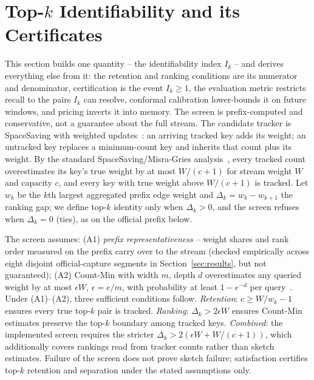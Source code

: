 \documentclass[conference]{IEEEtran}
\begin{document}
\section{Top-$k$ Identifiability and its Certificates}
\label{sec:screen}
This section builds one quantity -- the identifiability index $I_k$ -- and derives everything else from it: the retention and ranking conditions are its numerator and denominator, certification is the event $I_k\geq1$, the evaluation metric restricts recall to the pairs $I_k$ can resolve, conformal calibration lower-bounds it on future windows, and pricing inverts it into memory. The screen is prefix-computed and conservative, not a guarantee about the full stream. The candidate tracker is SpaceSaving with weighted updates~\cite{metwally2005spacesaving}: an arriving tracked key adds its weight; an untracked key replaces a minimum-count key and inherits that count plus its weight. By the standard SpaceSaving/Misra-Gries analysis~\cite{misra1982finding,metwally2005spacesaving}, every tracked count overestimates its key's true weight by at most $W/(c+1)$ for stream weight $W$ and capacity $c$, and every key with true weight above $W/(c+1)$ is tracked. Let $w_k$ be the $k$th largest aggregated prefix edge weight and $\Delta_k=w_k-w_{k+1}$ the ranking gap; we define top-$k$ identity only when $\Delta_k>0$, and the screen refuses when $\Delta_k=0$ (ties), as on the official prefix below.

The screen assumes: (A1) \emph{prefix representativeness} -- weight shares and rank order measured on the prefix carry over to the stream (checked empirically across eight disjoint official-capture segments in Section~\ref{sec:results}, but not guaranteed); (A2) Count-Min with width $m$, depth $d$ overestimates any queried weight by at most $\epsilon W$, $\epsilon=e/m$, with probability at least $1-e^{-d}$ per query~\cite{cormode2005countmin}. Under (A1)--(A2), three sufficient conditions follow. \emph{Retention}: $c\geq W/w_k-1$ ensures every true top-$k$ pair is tracked. \emph{Ranking}: $\Delta_k>2\epsilon W$ ensures Count-Min estimates preserve the top-$k$ boundary among tracked keys. \emph{Combined}: the implemented screen requires the stricter $\Delta_k>2(\epsilon W+W/(c+1))$, which additionally covers rankings read from tracker counts rather than sketch estimates. Failure of the screen does not prove sketch failure; satisfaction certifies top-$k$ retention and separation under the stated assumptions only.
\end{document}
